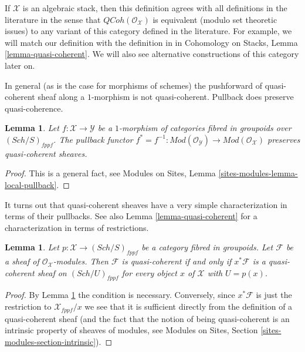 \documentclass{stacks-project}
\theoremstyle{plain}
\newtheorem{lemma}[subsection]{Lemma}
\theoremstyle{definition}
\theoremstyle{remark}
\numberwithin{equation}{subsection}
\def\Sch{\mathit{Sch}}
\def\QCoh{\mathit{QCoh}}
\begin{document}
\noindent
If $\mathcal{X}$ is an algebraic stack, then this definition agrees with all
definitions in the literature in the sense that $\QCoh(\mathcal{O}_\mathcal{X})$
is equivalent (modulo set theoretic issues) to any variant of this category
defined in the literature. For example, we will match our definition with
the definition in \cite[Definition 6.1]{olsson_sheaves} in
Cohomology on Stacks, Lemma \ref{lemma-quasi-coherent}.
We will also see alternative constructions of this category later on.

\medskip\noindent
In general (as is the case for morphisms of schemes) the pushforward
of quasi-coherent sheaf along a $1$-morphism is not quasi-coherent.
Pullback does preserve quasi-coherence.

\begin{lemma}
\label{lemma-pullback-quasi-coherent}
Let $f : \mathcal{X} \to \mathcal{Y}$ be a $1$-morphism of categories
fibred in groupoids over $(\Sch/S)_{fppf}$.
The pullback functor
$f^* = f^{-1} : \textit{Mod}(\mathcal{O}_\mathcal{Y}) \to
\textit{Mod}(\mathcal{O}_\mathcal{X})$
preserves quasi-coherent sheaves.
\end{lemma}

\begin{proof}
This is a general fact, see
Modules on Sites, Lemma \ref{sites-modules-lemma-local-pullback}.
\end{proof}

\noindent
It turns out that quasi-coherent sheaves have a very simple
characterization in terms of their pullbacks. See also
Lemma \ref{lemma-quasi-coherent}
for a characterization in terms of restrictions.

\begin{lemma}
\label{lemma-characterize-quasi-coherent}
Let $p : \mathcal{X} \to (\Sch/S)_{fppf}$ be a category
fibred in groupoids. Let $\mathcal{F}$
be a sheaf of $\mathcal{O}_\mathcal{X}$-modules. Then $\mathcal{F}$
is quasi-coherent if and only if $x^*\mathcal{F}$ is a quasi-coherent
sheaf on $(\Sch/U)_{fppf}$ for every object $x$ of
$\mathcal{X}$ with $U = p(x)$.
\end{lemma}

\begin{proof}
By
Lemma \ref{lemma-pullback-quasi-coherent}
the condition is necessary. Conversely, since $x^*\mathcal{F}$
is just the restriction to $\mathcal{X}_{fppf}/x$ we see that it
is sufficient directly from the definition of a quasi-coherent sheaf
(and the fact that the notion of being quasi-coherent is an intrinsic
property of sheaves of modules, see
Modules on Sites, Section \ref{sites-modules-section-intrinsic}).
\end{proof}
\end{document}
